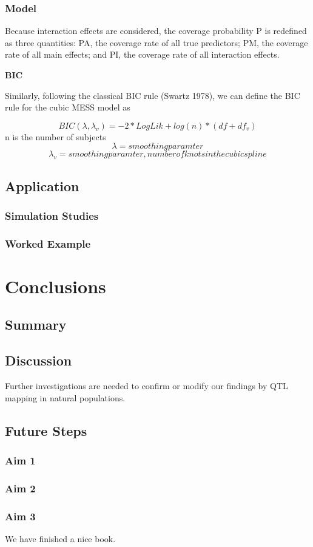 \documentclass[]{book}
\theoremstyle{definition}
\theoremstyle{definition}
\theoremstyle{remark}
\begin{document}
\subsection{Model}\label{model}

Because interaction effects are considered, the coverage probability P
is redefined as three quantities: PA, the coverage rate of all true
predictors; PM, the coverage rate of all main effects; and PI, the
coverage rate of all interaction effects.

\textbf{BIC}

Similarly, following the classical BIC rule (Swartz 1978), we can define
the BIC rule for the cubic MESS model as

\[BIC(\lambda, \lambda_v ) = -2*LogLik + log(n)*(df + df_v)\] n is the
number of subjects \cite{wu2006nonparametric}
\[\lambda = smoothing paramter\]
\[\lambda_v = smoothing paramter, number of knots in the cubic spline\]

\section{Application}\label{application-2}

\subsection{Simulation Studies}\label{simulation-studies-1}

\subsection{Worked Example}\label{worked-example-1}

\chapter{Conclusions}\label{conclusions}

\section{Summary}\label{summary}

\section{Discussion}\label{discussion-2}

Further investigations are needed to confirm or modify our findings by
QTL mapping in natural populations.

\section{Future Steps}\label{future-steps}

\subsection{Aim 1}\label{aim-1}

\subsection{Aim 2}\label{aim-2}

\subsection{Aim 3}\label{aim-3}

We have finished a nice book.


\end{document}
